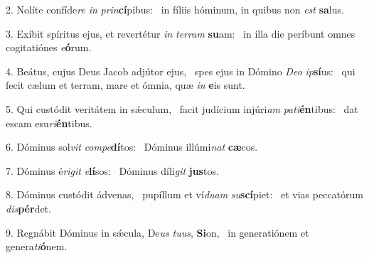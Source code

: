 2. Nolíte confíde\textit{re} \textit{in} \textit{prin}\textbf{cí}pibus: \ast\  in fíliis hóminum, in quibus non \textit{est} \textbf{sa}lus.\

3. Exíbit spíritus ejus, et revertétur \textit{in} \textit{ter}\textit{ram} \textbf{su}am: \ast\  in illa die períbunt omnes cogitatiónes \textit{e}\textbf{ó}rum.\

4. Beátus, cujus Deus Jacob adjútor ejus, \dag\  spes ejus in Dómino \textit{De}\textit{o} \textit{ip}\textbf{sí}us: \ast\  qui fecit cælum et terram, mare et ómnia, quæ \textit{in} \textbf{e}is sunt.\

5. Qui custódit veritátem in sǽculum, \dag\  facit judícium injúri\textit{am} \textit{pa}\textit{ti}\textbf{én}tibus: \ast\  dat escam esu\textit{ri}\textbf{én}tibus.\

6. Dóminus sol\textit{vit} \textit{com}\textit{pe}\textbf{dí}tos: \ast\  Dóminus illúmi\textit{nat} \textbf{cæ}cos.\

7. Dóminus é\textit{ri}\textit{git} \textit{e}\textbf{lí}sos: \ast\  Dóminus díli\textit{git} \textbf{jus}tos.\

8. Dóminus custódit ádvenas, \dag\  pupíllum et ví\textit{du}\textit{am} \textit{su}\textbf{scí}piet: \ast\  et vias peccatórum \textit{dis}\textbf{pér}det.\

9. Regnábit Dóminus in sǽcula, De\textit{us} \textit{tu}\textit{us}, \textbf{Si}on, \ast\  in generatiónem et genera\textit{ti}\textbf{ó}nem.\


